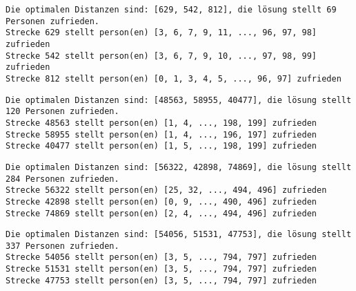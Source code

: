 
\begin{lstlisting}
Die optimalen Distanzen sind: [629, 542, 812], die lösung stellt 69 Personen zufrieden.
Strecke 629 stellt person(en) [3, 6, 7, 9, 11, ..., 96, 97, 98] zufrieden
Strecke 542 stellt person(en) [3, 6, 7, 9, 10, ..., 97, 98, 99] zufrieden
Strecke 812 stellt person(en) [0, 1, 3, 4, 5, ..., 96, 97] zufrieden
\end{lstlisting}


\begin{lstlisting}
Die optimalen Distanzen sind: [48563, 58955, 40477], die lösung stellt 120 Personen zufrieden.
Strecke 48563 stellt person(en) [1, 4, ..., 198, 199] zufrieden
Strecke 58955 stellt person(en) [1, 4, ..., 196, 197] zufrieden
Strecke 40477 stellt person(en) [1, 5, ..., 198, 199] zufrieden
\end{lstlisting}


\begin{lstlisting}
Die optimalen Distanzen sind: [56322, 42898, 74869], die lösung stellt 284 Personen zufrieden.
Strecke 56322 stellt person(en) [25, 32, ..., 494, 496] zufrieden
Strecke 42898 stellt person(en) [0, 9, ..., 490, 496] zufrieden
Strecke 74869 stellt person(en) [2, 4, ..., 494, 496] zufrieden
\end{lstlisting}


\begin{lstlisting}
Die optimalen Distanzen sind: [54056, 51531, 47753], die lösung stellt 337 Personen zufrieden.
Strecke 54056 stellt person(en) [3, 5, ..., 794, 797] zufrieden
Strecke 51531 stellt person(en) [3, 5, ..., 794, 797] zufrieden
Strecke 47753 stellt person(en) [3, 5, ..., 794, 797] zufrieden
\end{lstlisting}




